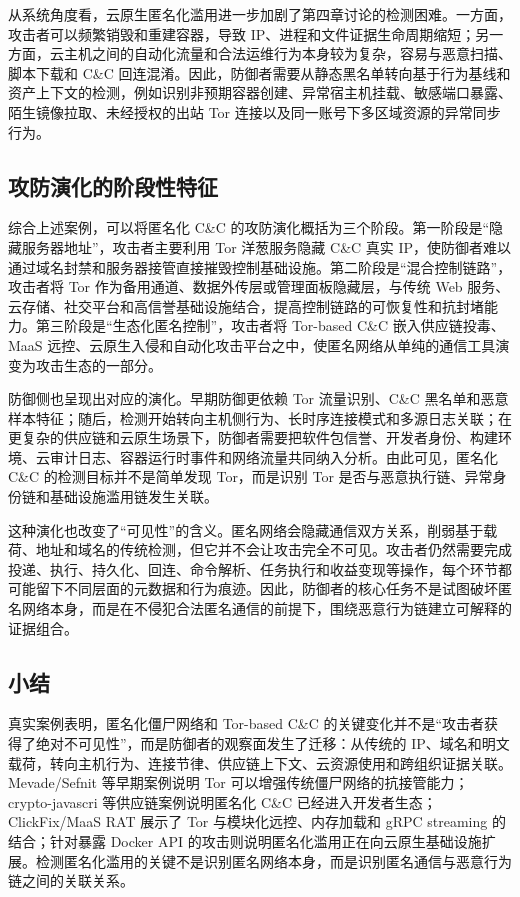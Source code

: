 从系统角度看，云原生匿名化滥用进一步加剧了第四章讨论的检测困难。一方面，攻击者可以频繁销毁和重建容器，导致 IP、进程和文件证据生命周期缩短；另一方面，云主机之间的自动化流量和合法运维行为本身较为复杂，容易与恶意扫描、脚本下载和 C\&C 回连混淆。因此，防御者需要从静态黑名单转向基于行为基线和资产上下文的检测，例如识别非预期容器创建、异常宿主机挂载、敏感端口暴露、陌生镜像拉取、未经授权的出站 Tor 连接以及同一账号下多区域资源的异常同步行为。

\subsection{攻防演化的阶段性特征}

综合上述案例，可以将匿名化 C\&C 的攻防演化概括为三个阶段。第一阶段是“隐藏服务器地址”，攻击者主要利用 Tor 洋葱服务隐藏 C\&C 真实 IP，使防御者难以通过域名封禁和服务器接管直接摧毁控制基础设施。第二阶段是“混合控制链路”，攻击者将 Tor 作为备用通道、数据外传层或管理面板隐藏层，与传统 Web 服务、云存储、社交平台和高信誉基础设施结合，提高控制链路的可恢复性和抗封堵能力。第三阶段是“生态化匿名控制”，攻击者将 Tor-based C&C 嵌入供应链投毒、MaaS 远控、云原生入侵和自动化攻击平台之中，使匿名网络从单纯的通信工具演变为攻击生态的一部分。

防御侧也呈现出对应的演化。早期防御更依赖 Tor 流量识别、C&C 黑名单和恶意样本特征；随后，检测开始转向主机侧行为、长时序连接模式和多源日志关联；在更复杂的供应链和云原生场景下，防御者需要把软件包信誉、开发者身份、构建环境、云审计日志、容器运行时事件和网络流量共同纳入分析。由此可见，匿名化 C\&C 的检测目标并不是简单发现 Tor，而是识别 Tor 是否与恶意执行链、异常身份链和基础设施滥用链发生关联。

这种演化也改变了“可见性”的含义。匿名网络会隐藏通信双方关系，削弱基于载荷、地址和域名的传统检测，但它并不会让攻击完全不可见。攻击者仍然需要完成投递、执行、持久化、回连、命令解析、任务执行和收益变现等操作，每个环节都可能留下不同层面的元数据和行为痕迹。因此，防御者的核心任务不是试图破坏匿名网络本身，而是在不侵犯合法匿名通信的前提下，围绕恶意行为链建立可解释的证据组合。

\subsection{小结}

真实案例表明，匿名化僵尸网络和 Tor-based C\&C 的关键变化并不是“攻击者获得了绝对不可见性”，而是防御者的观察面发生了迁移：从传统的 IP、域名和明文载荷，转向主机行为、连接节律、供应链上下文、云资源使用和跨组织证据关联。Mevade/Sefnit 等早期案例说明 Tor 可以增强传统僵尸网络的抗接管能力；crypto-javascri 等供应链案例说明匿名化 C&C 已经进入开发者生态；ClickFix/MaaS RAT 展示了 Tor 与模块化远控、内存加载和 gRPC streaming 的结合；针对暴露 Docker API 的攻击则说明匿名化滥用正在向云原生基础设施扩展。检测匿名化滥用的关键不是识别匿名网络本身，而是识别匿名通信与恶意行为链之间的关联关系。
